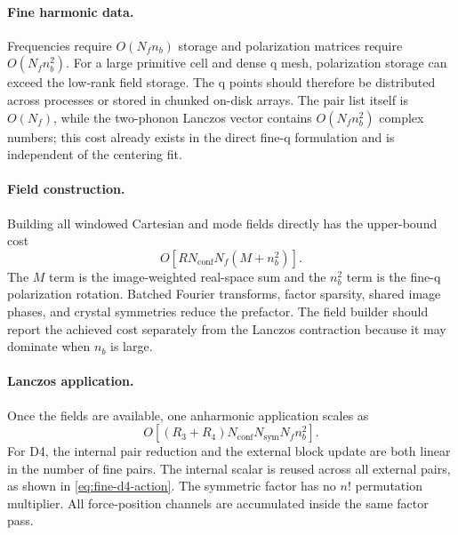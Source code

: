 \documentclass{article}
\newcommand{\Nf}{N_f}
\begin{document}
\paragraph{Fine harmonic data.}
Frequencies require $O(\Nf n_b)$ storage and polarization matrices require
$O(\Nf n_b^2)$. For a large primitive cell and dense q mesh, polarization
storage can exceed the low-rank field storage. The q points should therefore
be distributed across processes or stored in chunked on-disk arrays. The
pair list itself is $O(\Nf)$, while the two-phonon Lanczos vector contains
$O(\Nf n_b^2)$ complex numbers; this cost already exists in the direct
fine-q formulation and is independent of the centering fit.

\paragraph{Field construction.}
Building all windowed Cartesian and mode fields directly has the
upper-bound cost
\begin{equation}
    O\left[
    R N_{\mathrm{conf}}\Nf(M+n_b^2)
    \right].
    \label{eq:field-build-cost}
\end{equation}
The $M$ term is the image-weighted real-space sum and the $n_b^2$ term is
the fine-q polarization rotation. Batched Fourier transforms, factor
sparsity, shared image phases, and crystal symmetries reduce the prefactor.
The field builder should report the achieved cost separately from the
Lanczos contraction because it may dominate when $n_b$ is large.

\paragraph{Lanczos application.}
Once the fields are available, one anharmonic application scales as
\begin{equation}
    O\left[
    (R_3+R_4)
    N_{\mathrm{conf}}N_{\mathrm{sym}}\Nf n_b^2
    \right].
    \label{eq:runtime-cost}
\end{equation}
For D4, the internal pair reduction and the external block update are both
linear in the number of fine pairs. The internal scalar is reused across
all external pairs, as shown in \autoref{eq:fine-d4-action}. The symmetric
factor has no $n!$ permutation multiplier. All force-position channels are
accumulated inside the same factor pass.
\end{document}
